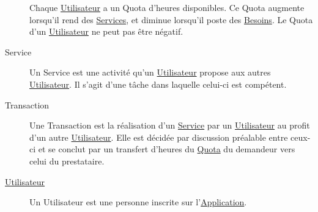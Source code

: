 \documentclass[french]{article}
\begin{document}
\begin{description}
				Chaque \hyperlink{utilisateur}{Utilisateur} a un Quota d’heures
				 disponibles. Ce Quota augmente lorsqu’il rend des
				 \hyperlink{service}{Services}, et diminue lorsqu’il poste des
				 \hyperlink{besoin}{Besoins}. Le Quota d’un
				 \hyperlink{utilisateur}{Utilisateur} ne peut pas être négatif.
			\item[\hypertarget{service}{Service}]
				Un Service est une activité qu’un \hyperlink{utilisateur}{Utilisateur}
				 propose aux autres \hyperlink{utilisateur}{Utilisateur}. Il s’agit
				 d’une tâche dans laquelle celui-ci est compétent.
			\item[\hypertarget{transaction}{Transaction}]
				Une Transaction est la réalisation d’un \hyperlink{service}{Service} par
				 un \hyperlink{utilisateur}{Utilisateur} au profit d’un autre
				 \hyperlink{utilisateur}{Utilisateur}. Elle est décidée par discussion
				 préalable entre ceux-ci et se conclut par un transfert
				 d’heures du \hyperlink{quota}{Quota} du demandeur vers celui du
				 prestataire.
			\item[\hypertarget{utilisateur}{\hyperlink{utilisateur}{Utilisateur}}]
				Un Utilisateur est une personne inscrite sur
				 l’\hyperlink{application}{Application}.
		\end{description}
		
\end{document}
